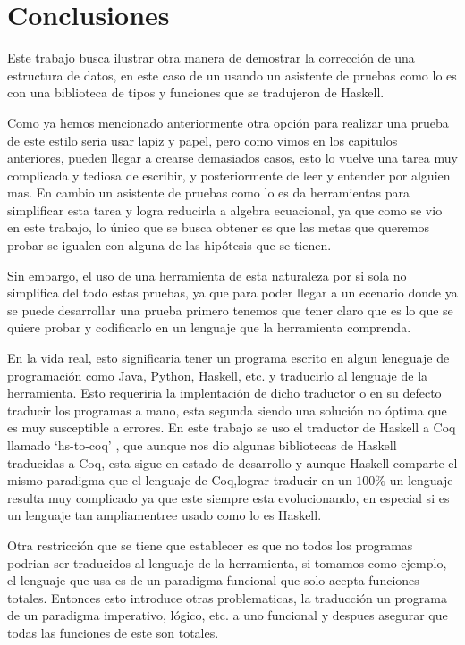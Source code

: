 \chapter{Conclusiones}
Este trabajo busca ilustrar otra manera de demostrar la correcci\'on de una estructura de datos,
en este caso de un {\arn} usando un asistente de pruebas como lo es {\coq} con una biblioteca de
tipos y funciones que se tradujeron de Haskell.

Como ya hemos mencionado anteriormente otra opci\'on para realizar una prueba de este estilo seria
usar lapiz y papel, pero como vimos en los capitulos anteriores, pueden llegar a crearse demasiados
casos, esto lo vuelve una tarea muy complicada y tediosa de escribir, y posteriormente de leer y
entender por alguien mas. En cambio un asistente de pruebas como lo es {\coq} da herramientas para
simplificar esta tarea y logra reducirla a algebra ecuacional, ya que como se vio en este trabajo,
lo \'unico que se busca obtener es que las metas que queremos probar se igualen con alguna de las
hip\'otesis que se tienen.

Sin embargo, el uso de una herramienta de esta naturaleza por si sola no simplifica del todo estas
pruebas, ya que para poder llegar a un ecenario donde ya se puede desarrollar una prueba primero
tenemos que tener claro que es lo que se quiere probar y codificarlo en un lenguaje que la
herramienta comprenda.

En la vida real, esto significaria tener un programa escrito en algun leneguaje de programaci\'on
como Java, Python, Haskell, etc. y traducirlo al lenguaje de la herramienta. Esto requeriria la
implentaci\'on de dicho traductor o en su defecto traducir los programas a mano, esta segunda
siendo una soluci\'on no \'optima que es muy susceptible a errores. En este trabajo se uso el
traductor de Haskell a Coq llamado `hs-to-coq' \cite{thrc}, que aunque nos dio algunas bibliotecas
de Haskell traducidas a Coq, esta sigue en estado de desarrollo y aunque Haskell comparte el mismo
paradigma que el lenguaje de Coq,lograr traducir en un $100\%$ un lenguaje resulta muy complicado
ya que este siempre esta evolucionando, en especial si es un lenguaje tan ampliamentree usado como
lo es Haskell.

Otra restricci\'on que se tiene que establecer es que no todos los programas podrian ser traducidos
al lenguaje de la herramienta, si tomamos {\coq} como ejemplo, el lenguaje que usa es de un
paradigma funcional que solo acepta funciones totales. Entonces esto introduce otras problematicas,
la traducción un programa de un paradigma imperativo, l\'ogico, etc. a uno funcional y despues
asegurar que todas las funciones de este son totales.

